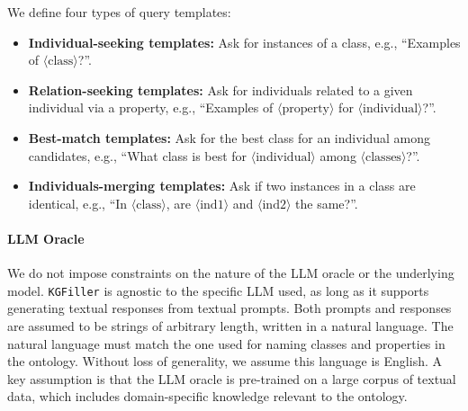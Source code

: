 %
We define four types of query templates:
%
\begin{itemize}
    \item \textbf{Individual-seeking templates:} Ask for instances of a class, e.g., ``Examples of \(\langle \text{class} \rangle\)?''.
    \item \textbf{Relation-seeking templates:} Ask for individuals related to a given individual via a property, e.g., ``Examples of \(\langle \text{property} \rangle\) for \(\langle \text{individual} \rangle\)?''.
    \item \textbf{Best-match templates:} Ask for the best class for an individual among candidates, e.g., ``What class is best for \(\langle \text{individual} \rangle\) among \(\langle \text{classes} \rangle\)?''.
    \item \textbf{Individuals-merging templates:} Ask if two instances in a class are identical, e.g., ``In \(\langle \text{class} \rangle\), are \(\langle \text{ind1} \rangle\) and \(\langle \text{ind2} \rangle\) the same?''.
\end{itemize}

%
\paragraph{\gls{LLM} Oracle}
We do not impose constraints on the nature of the \gls{LLM} oracle or the underlying model.
%
\texttt{KGFiller} is agnostic to the specific \gls{LLM} used, as long as it supports generating textual responses from textual prompts.
%
Both prompts and responses are assumed to be strings of arbitrary length, written in a natural language.
%
The natural language must match the one used for naming classes and properties in the ontology.
%
Without loss of generality, we assume this language is English.
%
A key assumption is that the \gls{LLM} oracle is pre-trained on a large corpus of textual data, which includes domain-specific knowledge relevant to the ontology.


